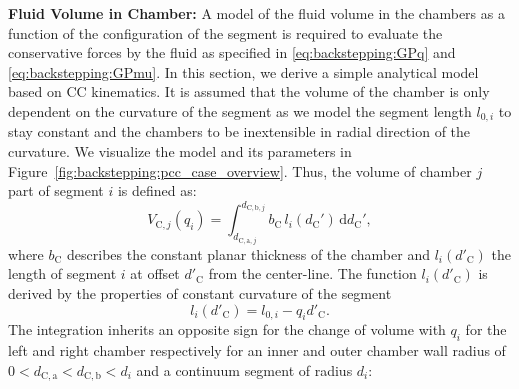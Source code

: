 \textbf{Fluid Volume in Chamber:}
A model of the fluid volume in the chambers as a function of the configuration of the segment is required to evaluate the conservative forces by the fluid as specified in \eqref{eq:backstepping:GPq} and \eqref{eq:backstepping:GPmu}. In this section, we derive a simple analytical model based on \gls{CC} kinematics.
It is assumed that the volume of the chamber is only dependent on the curvature of the segment as we model the segment length $l_{0,i}$ to stay constant and the chambers to be inextensible in radial direction of the curvature. We visualize the model and its parameters in Figure~\ref{fig:backstepping:pcc_case_overview}. Thus, the volume of chamber $j$ part of segment $i$ is defined as:
\begin{equation}
    V_{\mathrm{C},j}(q_i) = \int_{d_{\mathrm{C},\mathrm{a},j}}^{d_{\mathrm{C},\mathrm{b},j}} b_\mathrm{C} \, l_i(d_\mathrm{C}') \, \mathrm{d}d_\mathrm{C}',
\end{equation}
where $b_\mathrm{C}$ describes the constant planar thickness of the chamber and $l_i(d'_\mathrm{C})$ the length of segment $i$ at offset $d'_\mathrm{C}$ from the center-line. 
The function $l_i(d'_\mathrm{C})$ is derived by the properties of constant curvature of the segment
\begin{equation}
    l_i(d'_\mathrm{C}) = l_{0,i} - q_i d'_\mathrm{C}.
\end{equation}
The integration inherits an opposite sign for the change of volume with $q_i$ for the left and right chamber respectively for an inner and outer chamber wall radius of $0 < d_{\mathrm{C},\mathrm{a}} < d_{\mathrm{C},\mathrm{b}} < d_i$ and a continuum segment of radius $d_i$:
